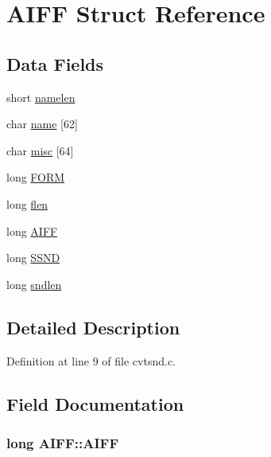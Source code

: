 \hypertarget{structAIFF}{\section{A\+I\+F\+F Struct Reference}
\label{structAIFF}
}
\subsection*{Data Fields}
\begin{DoxyCompactItemize}
\item 
short \hyperlink{structAIFF_aab9dbd8c399f4520df88047c706508bd}{namelen}
\item 
char \hyperlink{structAIFF_a0e5410410479ba3a2ba2f693e9b97953}{name} \mbox{[}62\mbox{]}
\item 
char \hyperlink{structAIFF_a26bfcc140ed24dceb897818afb302332}{misc} \mbox{[}64\mbox{]}
\item 
long \hyperlink{structAIFF_a2a365abd76f7768b689bfa9d48f3aea3}{F\+O\+R\+M}
\item 
long \hyperlink{structAIFF_a9f488b6fd2df520b510cf9d4f6fd8a93}{flen}
\item 
long \hyperlink{structAIFF_a33fad02037ded43deab0c11d78663223}{A\+I\+F\+F}
\item 
long \hyperlink{structAIFF_a9c582bb0f3a805186275c4ac14e46da9}{S\+S\+N\+D}
\item 
long \hyperlink{structAIFF_a8f1cede21c2276515408d7f1a396095c}{sndlen}
\end{DoxyCompactItemize}


\subsection{Detailed Description}


Definition at line 9 of file cvtsnd.\+c.



\subsection{Field Documentation}
\hypertarget{structAIFF_a33fad02037ded43deab0c11d78663223}{
\subsubsection[{A\+I\+F\+F}]{\setlength{\rightskip}{0pt plus 5cm}long A\+I\+F\+F\+::\+A\+I\+F\+F}}\label{structAIFF_a33fad02037ded43deab0c11d78663223}


